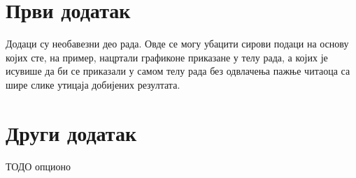 
\begin{appendices}

\section{Први додатак}
Додаци су необавезни део рада. Овде се могу убацити сирови подаци на основу којих сте, на пример, нацртали графиконе приказане у телу рада, а којих је исувише да би се приказали у самом телу рада без одвлачења пажње читаоца са шире слике утицаја добијених резултата.

\section{Други додатак}
ТОДО опционо

\end{appendices}
